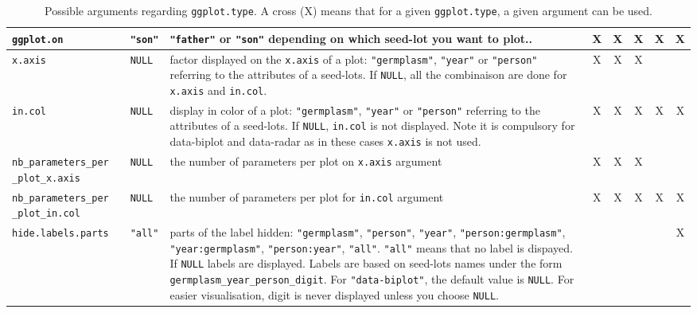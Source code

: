 \documentclass{article}\usepackage[]{graphicx}\usepackage[]{color}
\begin{document}
\begin{itemize}
\begin{itemize}
\begin{center}
\begin{table}[H]
\begin{tabular}{ 
p{} 
p{} 
p{}
ccccc 
}
\texttt{ggplot.on} & 
\texttt{"son"} & 
\texttt{"father"} or \texttt{"son"} depending on which seed-lot you want to plot.. &
X &
X &
X &
X &
X \\
\hline

\texttt{x.axis} & 
\texttt{NULL} & 
factor displayed on the \texttt{x.axis}	 of a plot: \texttt{"germplasm"}, \texttt{"year"} or \texttt{"person"} referring to the attributes of a seed-lots. If \texttt{NULL}, all the combinaison are done for \texttt{x.axis} and \texttt{in.col}. &
X &
X &
X &
  &
\\
\hline

\texttt{in.col} & 
\texttt{NULL} & 
display in color of a plot: \texttt{"germplasm"}, \texttt{"year"} or \texttt{"person"} referring to the attributes of a seed-lots. If \texttt{NULL}, \texttt{in.col} is not displayed. Note it is compulsory for data-biplot and data-radar as in these cases \texttt{x.axis} is not used. &
X &
X &
X &
X &
X \\
\hline

\texttt{nb\_parameters\_per} \texttt{\_plot\_x.axis} & 
\texttt{NULL} & 
the number of parameters per plot on \texttt{x.axis} argument &
X &
X &
X &
  &
\\
\hline

\texttt{nb\_parameters\_per} \texttt{\_plot\_in.col} & 
\texttt{NULL} & 
the number of parameters per plot for \texttt{in.col} argument &
X &
X &
X &
X &
X \\
\hline

\texttt{hide.labels.parts} & 
\texttt{"all"} & 
parts of the label hidden: \texttt{"germplasm"}, \texttt{"person"}, \texttt{"year"}, \texttt{"person:germplasm"}, \texttt{"year:germplasm"}, \texttt{"person:year"}, \texttt{"all"}. 
\texttt{"all"} means that no label is dispayed. 
If \texttt{NULL} labels are displayed. Labels are based on seed-lots names under the form \texttt{germplasm\_year\_person\_digit}.
For \texttt{"data-biplot"}, the default value is \texttt{NULL}.
For easier visualisation, digit is never displayed unless you choose \texttt{NULL}. &
  &
  &
  &
  &
X \\

\hline
\end{tabular}
\caption{Possible arguments regarding \texttt{ggplot.type}.
A cross (X) means that for a given \texttt{ggplot.type}, a given argument can be used.}
\label{custom.plot}
\end{table}
\end{center}

\end{itemize}


\end{itemize}
\end{document}
